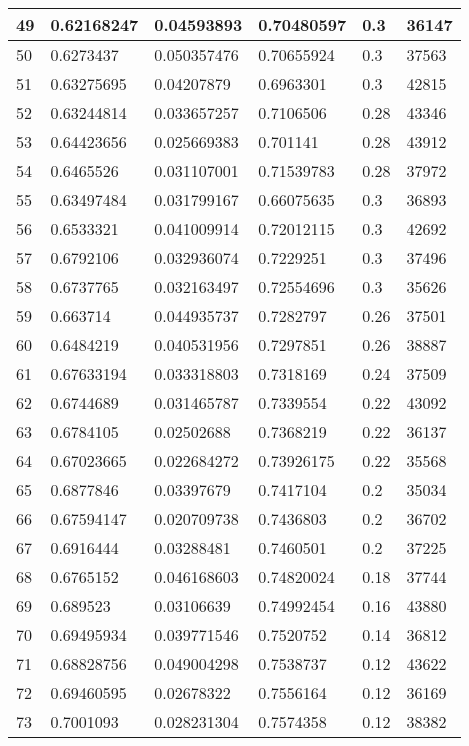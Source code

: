 \begin{longtable}{|l|l|l|l|l|l|}
49 & 0.62168247 & 0.04593893 & 0.70480597 & 0.3 & 36147 \\ \hline 
50 & 0.6273437 & 0.050357476 & 0.70655924 & 0.3 & 37563 \\ \hline 
51 & 0.63275695 & 0.04207879 & 0.6963301 & 0.3 & 42815 \\ \hline 
52 & 0.63244814 & 0.033657257 & 0.7106506 & 0.28 & 43346 \\ \hline 
53 & 0.64423656 & 0.025669383 & 0.701141 & 0.28 & 43912 \\ \hline 
54 & 0.6465526 & 0.031107001 & 0.71539783 & 0.28 & 37972 \\ \hline 
55 & 0.63497484 & 0.031799167 & 0.66075635 & 0.3 & 36893 \\ \hline 
56 & 0.6533321 & 0.041009914 & 0.72012115 & 0.3 & 42692 \\ \hline 
57 & 0.6792106 & 0.032936074 & 0.7229251 & 0.3 & 37496 \\ \hline 
58 & 0.6737765 & 0.032163497 & 0.72554696 & 0.3 & 35626 \\ \hline 
59 & 0.663714 & 0.044935737 & 0.7282797 & 0.26 & 37501 \\ \hline 
60 & 0.6484219 & 0.040531956 & 0.7297851 & 0.26 & 38887 \\ \hline 
61 & 0.67633194 & 0.033318803 & 0.7318169 & 0.24 & 37509 \\ \hline 
62 & 0.6744689 & 0.031465787 & 0.7339554 & 0.22 & 43092 \\ \hline 
63 & 0.6784105 & 0.02502688 & 0.7368219 & 0.22 & 36137 \\ \hline 
64 & 0.67023665 & 0.022684272 & 0.73926175 & 0.22 & 35568 \\ \hline 
65 & 0.6877846 & 0.03397679 & 0.7417104 & 0.2 & 35034 \\ \hline 
66 & 0.67594147 & 0.020709738 & 0.7436803 & 0.2 & 36702 \\ \hline 
67 & 0.6916444 & 0.03288481 & 0.7460501 & 0.2 & 37225 \\ \hline 
68 & 0.6765152 & 0.046168603 & 0.74820024 & 0.18 & 37744 \\ \hline 
69 & 0.689523 & 0.03106639 & 0.74992454 & 0.16 & 43880 \\ \hline 
70 & 0.69495934 & 0.039771546 & 0.7520752 & 0.14 & 36812 \\ \hline 
71 & 0.68828756 & 0.049004298 & 0.7538737 & 0.12 & 43622 \\ \hline 
72 & 0.69460595 & 0.02678322 & 0.7556164 & 0.12 & 36169 \\ \hline 
73 & 0.7001093 & 0.028231304 & 0.7574358 & 0.12 & 38382 \\ \hline 

\end{longtable}
